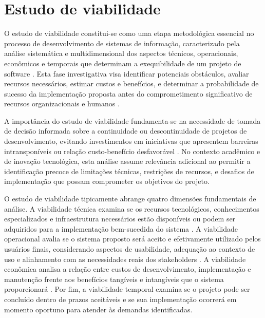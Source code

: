 \chapter{Estudo de viabilidade}\label{sec:EstuViab}
O estudo de viabilidade constitui-se como uma etapa metodológica essencial no processo de desenvolvimento de sistemas de informação, caracterizado pela análise sistemática e multidimensional dos aspectos técnicos, operacionais, econômicos e temporais que determinam a exequibilidade de um projeto de software \cite{pressman2014software}. Esta fase investigativa visa identificar potenciais obstáculos, avaliar recursos necessários, estimar custos e benefícios, e determinar a probabilidade de sucesso da implementação proposta antes do comprometimento significativo de recursos organizacionais e humanos \cite{sommerville2016engineering}.

A importância do estudo de viabilidade fundamenta-se na necessidade de tomada de decisão informada sobre a continuidade ou descontinuidade de projetos de desenvolvimento, evitando investimentos em iniciativas que apresentem barreiras intransponíveis ou relação custo-benefício desfavorável \cite{kendall2014systems}. No contexto acadêmico e de inovação tecnológica, esta análise assume relevância adicional ao permitir a identificação precoce de limitações técnicas, restrições de recursos, e desafios de implementação que possam comprometer os objetivos do projeto.

O estudo de viabilidade tipicamente abrange quatro dimensões fundamentais de análise. A viabilidade técnica examina se os recursos tecnológicos, conhecimentos especializados e infraestrutura necessários estão disponíveis ou podem ser adquiridos para a implementação bem-sucedida do sistema \cite{whitten2003systems}. A viabilidade operacional avalia se o sistema proposto será aceito e efetivamente utilizado pelos usuários finais, considerando aspectos de usabilidade, adequação ao contexto de uso e alinhamento com as necessidades reais dos stakeholders \cite{dennis2015systems}. A viabilidade econômica analisa a relação entre custos de desenvolvimento, implementação e manutenção frente aos benefícios tangíveis e intangíveis que o sistema proporcionará \cite{marakas2006systems}. Por fim, a viabilidade temporal examina se o projeto pode ser concluído dentro de prazos aceitáveis e se sua implementação ocorrerá em momento oportuno para atender às demandas identificadas.

